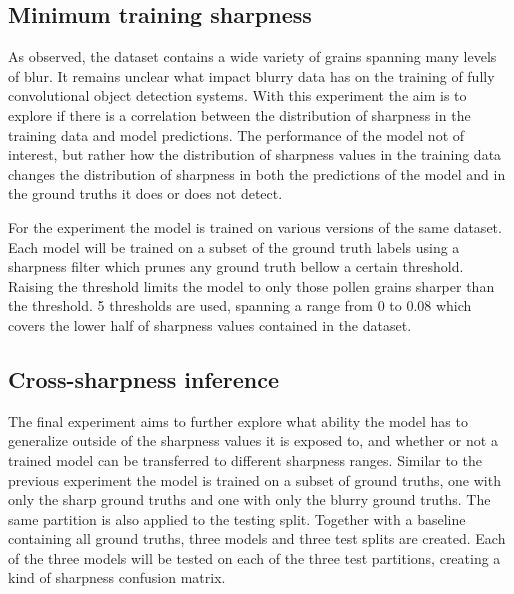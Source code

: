 \subsection{Minimum training sharpness}
As observed, the dataset contains a wide variety of grains spanning many levels of blur.
It remains unclear what impact blurry data has on the training of fully convolutional object detection systems.
With this experiment the aim is to explore if there is a correlation between the distribution of sharpness in the training data and model predictions.
The performance of the model not of interest, but rather how the distribution of sharpness values in the training data changes the distribution of sharpness in both the predictions of the model and in the ground truths it does or does not detect.

For the experiment the model is trained on various versions of the same dataset.
Each model will be trained on a subset of the ground truth labels using a sharpness filter which prunes any ground truth bellow a certain threshold.
Raising the threshold limits the model to only those pollen grains sharper than the threshold.
5 thresholds are used, spanning a range from 0 to 0.08 which covers the lower half of sharpness values contained in the dataset.

\subsection{Cross-sharpness inference}
The final experiment aims to further explore what ability the model has to generalize outside of the sharpness values it is exposed to, and whether or not a trained model can be transferred to different sharpness ranges.
Similar to the previous experiment the model is trained on a subset of ground truths, one with only the sharp ground truths and one with only the blurry ground truths.
The same partition is also applied to the testing split.
Together with a baseline containing all ground truths, three models and three test splits are created.
Each of the three models will be tested on each of the three test partitions, creating a kind of sharpness confusion matrix.

